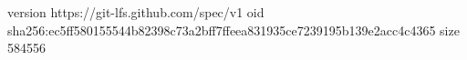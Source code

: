 version https://git-lfs.github.com/spec/v1
oid sha256:ec5ff580155544b82398c73a2bff7ffeea831935ce7239195b139e2acc4c4365
size 584556

